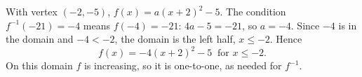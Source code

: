 With vertex $(-2,-5)$, $f(x)=a(x+2)^2-5$. The condition $f^{-1}(-21)=-4$ means $f(-4)=-21$: $4a-5=-21$, so $a=-4$. Since $-4$ is in the domain and $-4<-2$, the domain is the left half, $x\le-2$. Hence
\[
\boxed{f(x)=-4(x+2)^2-5\ \text{ for }x\le-2}.
\]
On this domain $f$ is increasing, so it is one-to-one, as needed for $f^{-1}$.
